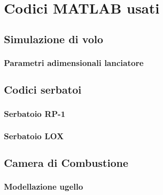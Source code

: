 \section{Codici MATLAB usati}
\label{appendix:codici}

\subsection{Simulazione di volo}



\subsubsection{Parametri adimensionali lanciatore}



\subsection{Codici serbatoi}

\subsubsection{Serbatoio RP-1}


\subsubsection{Serbatoio LOX}


\subsection{Camera di Combustione}


\subsubsection{Modellazione ugello}






